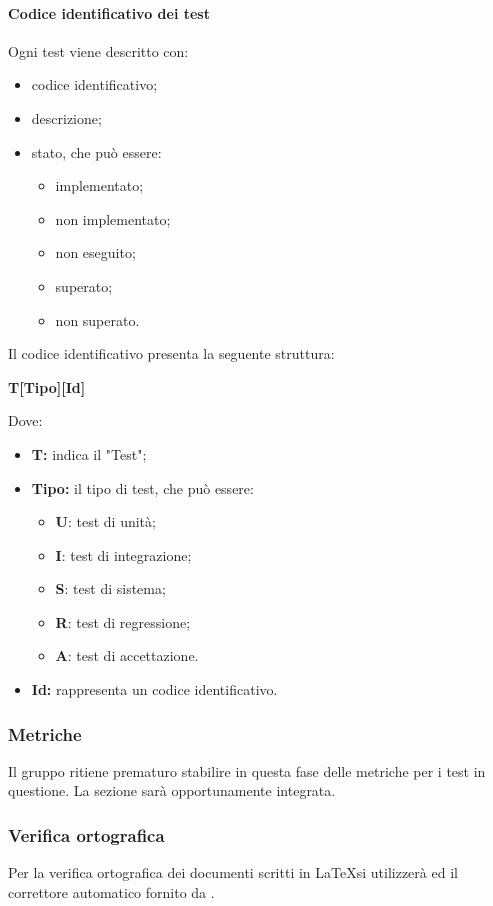 \paragraph{Codice identificativo dei test}
Ogni test viene descritto con:
\begin{itemize}
	\item codice identificativo;
	\item descrizione;
	\item stato, che può essere:
	\begin{itemize}
		\item implementato;
		\item non implementato;
		\item non eseguito;
		\item superato;
		\item non superato.
	\end{itemize}
\end{itemize}
Il codice identificativo presenta la seguente struttura:\newline
\centerline{\textbf{T[Tipo][Id]}}
\newline
Dove:
\begin{itemize}
	\item \textbf{T:} indica il "Test";
	\item \textbf{Tipo:} il tipo di test, che può essere:
	\begin{itemize}
		\item \textbf{U}: test di unità;
		\item \textbf{I}: test di integrazione;
		\item \textbf{S}: test di sistema;
		\item \textbf{R}: test di regressione;
		\item \textbf{A}: test di accettazione.
	\end{itemize}
	\item \textbf{Id:} rappresenta un codice identificativo.
\end{itemize}

\subsubsection{Metriche}
Il gruppo ritiene prematuro stabilire in questa fase delle metriche per i test in questione. La sezione sarà opportunamente integrata.
\subsubsection{Verifica ortografica}
Per la verifica ortografica dei documenti scritti in \LaTeX si utilizzerà  ed il correttore automatico fornito da .
